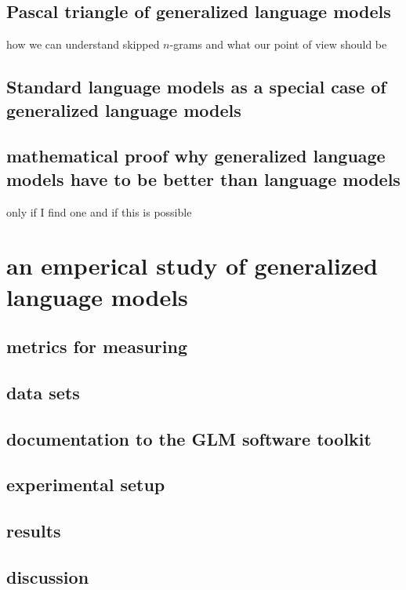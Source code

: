 \documentclass[•]{book}
\begin{document}
\section{Pascal triangle of generalized language models}
how we can understand skipped $n$-grams and what our point of view should be

\section{Standard language models as a special case of generalized language models}

\section{mathematical proof why generalized language models have to be better than language models}
only if I find one and if this is possible


\chapter{an emperical study of generalized language models}
\section{metrics for measuring}
\section{data sets}
\section{documentation to the GLM software toolkit}
\section{experimental setup}
\section{results}
\section{discussion}
\end{document}
